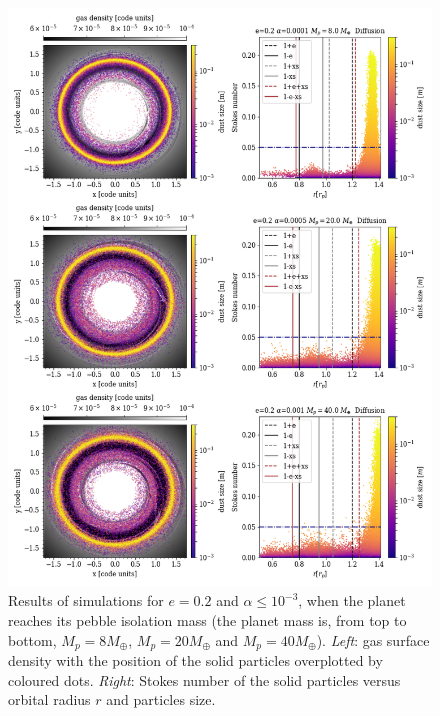 \documentclass[fleqn,usenatbib]{mnras}
\begin{document}
\begin{figure}
	\includegraphics[scale=0.6]{IMEP_dens_dust.png}
    \caption{Results of simulations for $e=0.2$ and $\alpha\leq10^{-3}$, when the planet reaches its pebble isolation mass (the planet mass is, from top to bottom, $M_p=8M_{\oplus}$, $M_p=20M_{\oplus}$ and $M_p=40M_{\oplus}$). \textit{Left}: gas surface density with the position of the solid particles overplotted by coloured dots.  \textit{Right}: Stokes number of the solid particles versus orbital radius $r$ and particles size.
    }
    \label{fig:r_vs_St_IMEP}
\end{figure}
\end{document}
